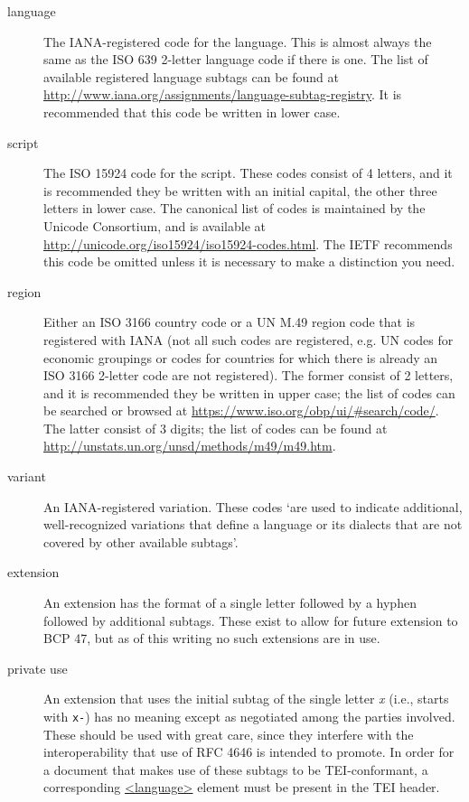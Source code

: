 \begin{reflist}
\begin{description}
\item[{language}]The IANA-registered code for the language. This is almost always the same as the ISO 639 2-letter language code if there is one. The list of available registered language subtags can be found at \url{http://www.iana.org/assignments/language-subtag-registry}. It is recommended that this code be written in lower case.
\item[{script}]The ISO 15924 code for the script. These codes consist of 4 letters, and it is recommended they be written with an initial capital, the other three letters in lower case. The canonical list of codes is maintained by the Unicode Consortium, and is available at \url{http://unicode.org/iso15924/iso15924-codes.html}. The IETF recommends this code be omitted unless it is necessary to make a distinction you need.
\item[{region}]Either an ISO 3166 country code or a UN M.49 region code that is registered with IANA (not all such codes are registered, e.g. UN codes for economic groupings or codes for countries for which there is already an ISO 3166 2-letter code are not registered). The former consist of 2 letters, and it is recommended they be written in upper case; the list of codes can be searched or browsed at \url{https://www.iso.org/obp/ui/\#search/code/}. The latter consist of 3 digits; the list of codes can be found at \url{http://unstats.un.org/unsd/methods/m49/m49.htm}.
\item[{variant}]An IANA-registered variation. These codes ‘are used to indicate additional, well-recognized variations that define a language or its dialects that are not covered by other available subtags’.
\item[{extension}]An extension has the format of a single letter followed by a hyphen followed by additional subtags. These exist to allow for future extension to BCP 47, but as of this writing no such extensions are in use.
\item[{private use}]An extension that uses the initial subtag of the single letter \textit{x} (i.e., starts with \texttt{x-}) has no meaning except as negotiated among the parties involved. These should be used with great care, since they interfere with the interoperability that use of RFC 4646 is intended to promote. In order for a document that makes use of these subtags to be TEI-conformant, a corresponding \hyperref[TEI.language]{<language>} element must be present in the TEI header.
\end{description} \par

\end{reflist}
